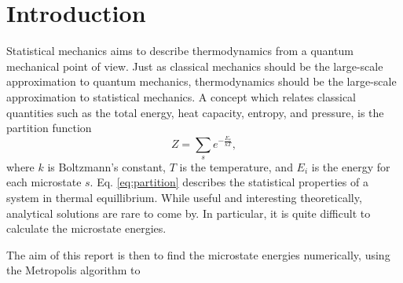 \section{Introduction}
\label{sec:introduction}

Statistical mechanics aims to describe thermodynamics from a quantum mechanical point of view.
Just as classical mechanics should be the large-scale approximation to quantum mechanics,
thermodynamics should be the large-scale approximation to statistical mechanics. A concept
which relates classical quantities such as the total energy, heat capacity, entropy, and pressure, is
the partition function
  \begin{equation}
    \label{eq:partition}
    Z = \sum_s e^{-\frac{E_s}{kT}},
  \end{equation}
where $k$ is Boltzmann's constant, $T$ is the temperature, and $E_i$ is the energy for each microstate $s$.
Eq. \ref{eq:partition} describes the statistical properties of a system in thermal equillibrium.
While useful and interesting theoretically, analytical solutions are rare to come by. In particular,
it is quite difficult to calculate the microstate energies.

The aim of this report is then to find the microstate energies numerically, using
the Metropolis algorithm to
